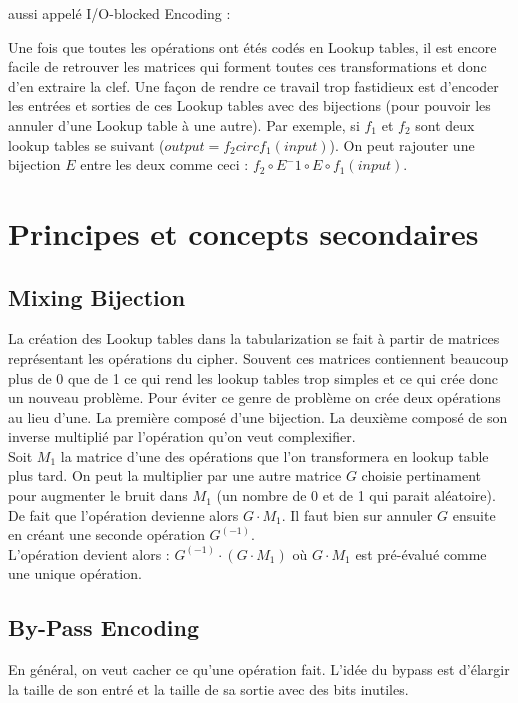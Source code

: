 \documentclass[a4paper,12pt]{article}
\begin{document}
aussi appelé I/O-blocked Encoding :

Une fois que toutes les opérations ont étés codés en Lookup tables, il est encore facile de retrouver les matrices qui forment toutes ces transformations et donc d'en extraire la clef. Une façon de rendre ce travail trop fastidieux est d'encoder les entrées et sorties de ces Lookup tables avec des bijections (pour pouvoir les annuler d'une Lookup table à une autre).
Par exemple, si $f_1$ et $f_2$ sont deux lookup tables se suivant ($output = f_2 circ f_1(input)$). On peut rajouter une bijection $E$ entre les deux comme ceci : $f_2 \circ E^-1 \circ E \circ f_1(input)$.

\section{Principes et concepts secondaires}


\subsection{Mixing Bijection}

La création des Lookup tables dans la tabularization se fait à partir de matrices représentant les opérations du cipher. Souvent ces matrices contiennent beaucoup plus de 0 que de 1 ce qui rend les lookup tables trop simples et ce qui crée donc un nouveau problème. Pour éviter ce genre de problème on crée deux opérations au lieu d'une. La première composé d'une bijection. La deuxième composé de son inverse multiplié par l'opération qu'on veut complexifier.\\
Soit $M_1$ la matrice d'une des opérations que l'on transformera en lookup table plus tard. On peut la multiplier par une autre matrice $G$ choisie pertinament pour augmenter le bruit dans $M_1$ (un nombre de 0 et de 1 qui parait aléatoire). De fait que l'opération devienne alors $G \cdot M_1$. Il faut bien sur annuler $G$ ensuite en créant une seconde opération $G^(-1)$.\\
L'opération devient alors : $G^(-1) \cdot (G \cdot M_1)$ où $G \cdot M_1$ est pré-évalué comme une unique opération.

\subsection{By-Pass Encoding}

En général, on veut cacher ce qu'une opération fait. L'idée du bypass est d'élargir la taille de son entré et la taille de sa sortie avec des bits inutiles.
\end{document}
